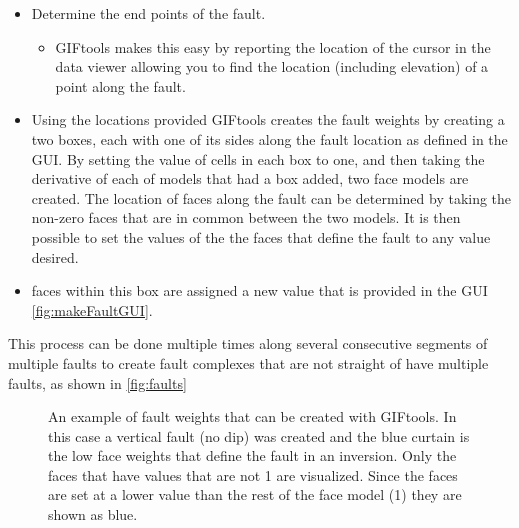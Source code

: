 \begin{itemize}
\item Determine the end points of the fault.
\begin{itemize}
	\item GIFtools makes this easy by reporting the location of the cursor in the data viewer allowing you to find the location (including elevation) of a point along the fault.
\end{itemize}
\item Using the locations provided GIFtools creates the fault weights by creating a two boxes, each with one of its sides along the fault location as defined in the \ac{GUI}. By setting the value of cells in each box to one, and then taking the derivative of each of models that had a box added, two face models are created. The location of faces along the fault can be determined by taking the non-zero faces that are in common between the two models.  It is then possible to set the values of the the faces that define the fault to any value desired.

\item faces within this box are assigned a new value that is provided in the GUI \autoref{fig:makeFaultGUI}.
\end{itemize}
%

This process can be done multiple times along several consecutive segments of multiple faults to create fault complexes that are not straight of have multiple faults, as shown in \autoref{fig:faults}

\begin{figure} [h]
    \centering
    \caption{An example of fault weights that can be created with GIFtools. In this case a vertical fault (no dip) was created and the blue curtain is the low face weights that define the fault in an inversion. Only the faces that have values that are not 1 are visualized. Since the faces are set at a lower value than the rest of the face model (1) they are shown as blue.}
    \label{fig:faults}
\end{figure}
\FloatBarrier

